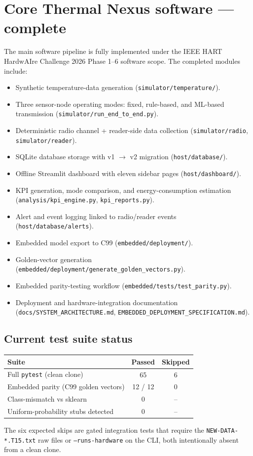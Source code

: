 \documentclass[11pt,a4paper]{article}
\begin{document}
\section{Core Thermal Nexus software --- complete}
The main software pipeline is fully implemented under the IEEE HART HardwAIre
Challenge 2026 Phase 1--6 software scope. The completed modules include:
\begin{itemize}[leftmargin=*]
  \item Synthetic temperature-data generation (\texttt{simulator/temperature/}).
  \item Three sensor-node operating modes: fixed, rule-based, and ML-based
        transmission (\texttt{simulator/run\_end\_to\_end.py}).
  \item Deterministic radio channel + reader-side data collection
        (\texttt{simulator/radio}, \texttt{simulator/reader}).
  \item SQLite database storage with v1 $\rightarrow$ v2 migration
        (\texttt{host/database/}).
  \item Offline Streamlit dashboard with eleven sidebar pages
        (\texttt{host/dashboard/}).
  \item KPI generation, mode comparison, and energy-consumption estimation
        (\texttt{analysis/kpi\_engine.py}, \texttt{kpi\_reports.py}).
  \item Alert and event logging linked to radio/reader events
        (\texttt{host/database/alerts}).
  \item Embedded model export to C99 (\texttt{embedded/deployment/}).
  \item Golden-vector generation (\texttt{embedded/deployment/generate\_golden\_vectors.py}).
  \item Embedded parity-testing workflow (\texttt{embedded/tests/test\_parity.py}).
  \item Deployment and hardware-integration documentation
        (\texttt{docs/SYSTEM\_ARCHITECTURE.md},
        \texttt{EMBEDDED\_DEPLOYMENT\_SPECIFICATION.md}).
\end{itemize}

\subsection{Current test suite status}
\begin{center}
\begin{tabular}{lcc}
\toprule
\textbf{Suite} & \textbf{Passed} & \textbf{Skipped} \\
\midrule
Full \texttt{pytest} (clean clone) & 65 & 6 \\
Embedded parity (C99 golden vectors) & 12 / 12 & 0 \\
Class-mismatch vs sklearn & 0 & -- \\
Uniform-probability stubs detected & 0 & -- \\
\bottomrule
\end{tabular}
\end{center}
The six expected skips are gated integration tests that require the
\texttt{NEW-DATA-*.T15.txt} raw files or \texttt{--runs-hardware} on the CLI,
both intentionally absent from a clean clone.
\end{document}
